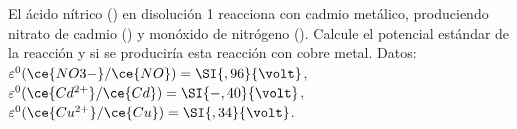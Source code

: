 El ácido nítrico () en disolución \SI{1}{\Molar} reacciona con cadmio metálico, produciendo nitrato de cadmio () y monóxido de nitrógeno (). Calcule el potencial estándar de la reacción y si se produciría esta reacción con cobre metal. Datos: $\varepsilon^0(\ce{NO3-}/\ce{NO}) = \SI{,96}{\volt}$, $\varepsilon^0(\ce{Cd^{2+}}/\ce{Cd}) = \SI{-,40}{\volt}$, $\varepsilon^0(\ce{Cu^{2+}}/\ce{Cu}) = \SI{,34}{\volt}$.
